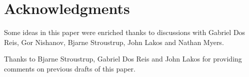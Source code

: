 \section{Acknowledgments}

Some ideas in this paper were enriched thanks to discussions with Gabriel Dos
Reis, Gor Nishanov, Bjarne Stroustrup, John Lakos and Nathan Myers.

Thanks to Bjarne Stroustrup, Gabriel Dos Reis and John Lakos for providing comments on previous drafts of this paper.
